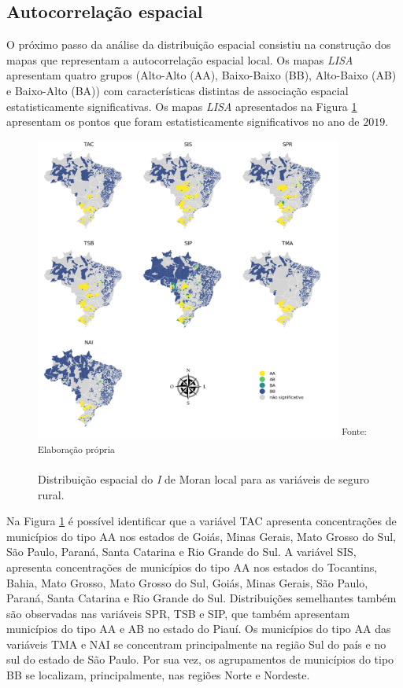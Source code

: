 \documentclass[
	12pt,				%
	openright,			%
	oneside,			%
	a4paper,			%
	chapter=TITLE,		%
	section=TITLE,		%
	english,			%
	french,				%
	spanish,			%
	brazil				%
	]{abntex2}
\begin{document}
\subsection{Autocorrelação espacial}

O próximo passo da análise da distribuição espacial consistiu na construção dos mapas que representam a autocorrelação espacial local. Os mapas \textit{LISA} apresentam quatro grupos (Alto-Alto (AA), Baixo-Baixo (BB), Alto-Baixo (AB) e  Baixo-Alto (BA)) com características distintas de associação espacial estatisticamente significativas. Os mapas \textit{LISA} apresentados na Figura \ref{lisa_variaveis} apresentam os pontos que foram estatisticamente significativos no ano de $2019$. 

\begin{figure}[h]
	\centering
	\caption{Distribuição espacial do \textit{I} de Moran local para as variáveis de seguro rural.}
	\includegraphics[width=0.9\textwidth]{img/map_i_moran_variaveis.png}
	\noindent \small \textsuperscript{Fonte: Elaboração própria}
	\label{lisa_variaveis}
\end{figure}

Na Figura \ref{lisa_variaveis} é possível identificar que a variável TAC apresenta concentrações de municípios do tipo AA nos estados de Goiás, Minas Gerais, Mato Grosso do Sul, São Paulo, Paraná, Santa Catarina e Rio Grande do Sul. A variável SIS, apresenta concentrações de municípios do tipo AA nos estados do Tocantins, Bahia, Mato Grosso, Mato Grosso do Sul, Goiás, Minas Gerais, São Paulo, Paraná, Santa Catarina e Rio Grande do Sul. Distribuições semelhantes também são observadas nas variáveis SPR, TSB e SIP, que também apresentam municípios do tipo AA e AB no estado do Piauí. Os municípios do tipo AA das variáveis TMA e NAI se concentram principalmente na região Sul do país e no sul do estado de São Paulo. Por sua vez, os agrupamentos de municípios do tipo BB se localizam, principalmente, nas regiões Norte e Nordeste. 
\end{document}
